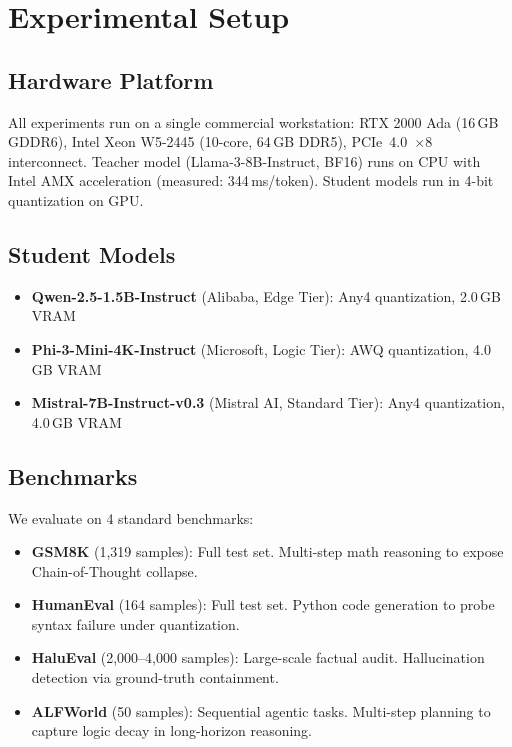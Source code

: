 \documentclass{uai2026}  %
\begin{document}
\section{Experimental Setup}
\enlargethispage{2\baselineskip}
\label{sec:setup}

\subsection{Hardware Platform}
All experiments run on a single commercial workstation:
RTX 2000 Ada (16\,GB GDDR6), Intel Xeon W5-2445 (10-core, 64\,GB DDR5),
PCIe~4.0~$\times$8 interconnect.
Teacher model (Llama-3-8B-Instruct, BF16) runs on CPU with Intel AMX
acceleration (measured: 344\,ms/token).
Student models run in 4-bit quantization on GPU.

\subsection{Student Models}
\begin{itemize}
  \item \textbf{Qwen-2.5-1.5B-Instruct} (Alibaba, Edge Tier): Any4 quantization, 2.0\,GB VRAM
  \item \textbf{Phi-3-Mini-4K-Instruct} (Microsoft, Logic Tier): AWQ quantization, 4.0\,GB VRAM
  \item \textbf{Mistral-7B-Instruct-v0.3} (Mistral AI, Standard Tier): Any4 quantization, 4.0\,GB VRAM
\end{itemize}

\subsection{Benchmarks}
We evaluate on 4 standard benchmarks:
\begin{itemize}
  \item \textbf{GSM8K} (1,319 samples): Full test set.
    Multi-step math reasoning to expose Chain-of-Thought collapse.
  \item \textbf{HumanEval} (164 samples): Full test set.
    Python code generation to probe syntax failure under quantization.
  \item \textbf{HaluEval} (2,000--4,000 samples): Large-scale factual audit.
    Hallucination detection via ground-truth containment.
  \item \textbf{ALFWorld} (50 samples): Sequential agentic tasks.
    Multi-step planning to capture logic decay in long-horizon reasoning.
\end{itemize}
\end{document}
